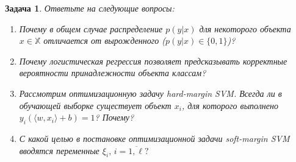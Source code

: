 \documentclass[12pt,fleqn]{article}
\newtheorem{esProblem}{Задача}
\begin{document}
\begin{esProblem}
    Ответьте на следующие вопросы:
    \begin{enumerate}
    \item Почему в общем случае распределение $p(y|x)$ для некоторого объекта $x \in \mathbb{X}$ отличается от вырожденного ($p(y|x) \in \{0,1\}$)?
    \item Почему логистическая регрессия позволяет предсказывать корректные вероятности принадлежности объекта классам?
    \item Рассмотрим оптимизационную задачу hard-margin SVM. Всегда ли в обучающей выборке существует объект $x_i$, для которого выполнено $y_i (\langle w, x_i \rangle + b) = 1$? Почему?
    \item С какой целью в постановке оптимизационной задачи soft-margin SVM вводятся переменные $\xi_i, \, i = \overline{1, \ell}?$
    \end{enumerate}
\end{esProblem}
\end{document}
